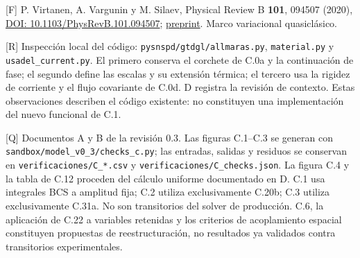 \documentclass[
  spanish,
  10pt,
  a4paper,
]{article}
\begin{document}
{[}F{]} P. Virtanen, A. Vargunin y M. Silaev, Physical Review B
\textbf{101}, 094507 (2020),
\href{https://doi.org/10.1103/PhysRevB.101.094507}{DOI:
10.1103/PhysRevB.101.094507};
\href{https://arxiv.org/abs/1909.00992}{preprint}. Marco variacional
quasiclásico.

{[}R{]} Inspección local del código: \nolinkurl{pysnspd/gtdgl/allmaras.py},
\nolinkurl{material.py} y \nolinkurl{usadel_current.py}. El primero conserva
el corchete de C.0a y la continuación de fase; el segundo define las
escalas y su extensión térmica; el tercero usa la rigidez de corriente y
el flujo covariante de C.0d. D registra la revisión de contexto. Estas
observaciones describen el código existente: no constituyen una
implementación del nuevo funcional de C.1.

{[}Q{]} Documentos A y B de la revisión 0.3. Las figuras C.1--C.3 se
generan con \nolinkurl{sandbox/model_v0_3/checks_c.py}; las entradas,
salidas y residuos se conservan en \nolinkurl{verificaciones/C_*.csv} y
\nolinkurl{verificaciones/C_checks.json}. La figura C.4 y la tabla de C.12
proceden del cálculo uniforme documentado en D. C.1 usa integrales BCS a
amplitud fija; C.2 utiliza exclusivamente C.20b; C.3 utiliza
exclusivamente C.31a. No son transitorios del solver de producción. C.6,
la aplicación de C.22 a variables retenidas y los criterios de
acoplamiento espacial constituyen propuestas de reestructuración, no
resultados ya validados contra transitorios experimentales.
\end{document}
